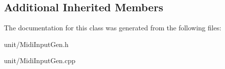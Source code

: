 \subsection*{Additional Inherited Members}


The documentation for this class was generated from the following files\+:\begin{DoxyCompactItemize}
\item 
unit/Midi\+Input\+Gen.\+h\item 
unit/Midi\+Input\+Gen.\+cpp\end{DoxyCompactItemize}
